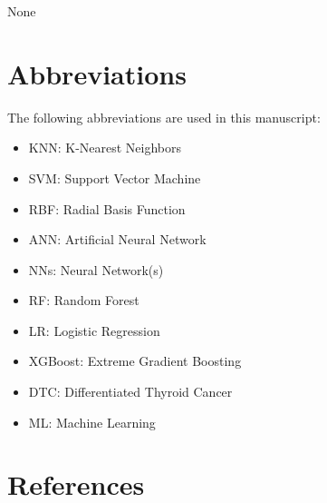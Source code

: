 \documentclass[
  letterpaper,
  DIV=11,
  numbers=noendperiod]{scrartcl}
\providecommand{\tightlist}{%
  \setlength{\itemsep}{0pt}\setlength{\parskip}{0pt}}\usepackage{longtable,booktabs,array}
\begin{document}
None

\section{Abbreviations}\label{abbreviations}

The following abbreviations are used in this manuscript:

\begin{itemize}
\tightlist
\item
  KNN: K-Nearest Neighbors
\item
  SVM: Support Vector Machine
\item
  RBF: Radial Basis Function
\item
  ANN: Artificial Neural Network
\item
  NNs: Neural Network(s)
\item
  RF: Random Forest
\item
  LR: Logistic Regression
\item
  XGBoost: Extreme Gradient Boosting
\item
  DTC: Differentiated Thyroid Cancer
\item
  ML: Machine Learning
\end{itemize}

\section*{References}\label{references}
\end{document}
